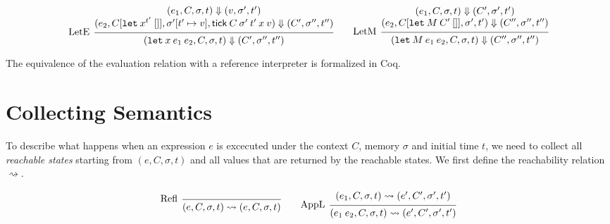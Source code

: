 \documentclass{article}
\theoremstyle{definition}
\newcommand*{\tick}{\mathsf{tick}}
\begin{document}
\[
  \begin{prooftree}
    \hypo{
      \begin{matrix}
        (e_{1}, C, \sigma, t)
        \Downarrow
        (v, \sigma', t') \\
        (e_{2}, C[\mathtt{let}\:x^{t'}\:[]], \sigma'[t'\mapsto v], \tick\:C\:\sigma'\:t'\:x\:v)
        \Downarrow
        (C', \sigma'', t'')
      \end{matrix}
    }
    \infer[left label=LetE]1{
    (\mathtt{let}\:x\:e_1\:e_2, C, \sigma, t)
    \Downarrow
    (C', \sigma'', t'')
    }
  \end{prooftree}\qquad
  \begin{prooftree}
    \hypo{
      \begin{matrix}
        (e_{1}, C, \sigma, t)
        \Downarrow
        (C', \sigma', t') \\
        (e_{2}, C[\mathtt{let}\:M\:C'\:[]], \sigma', t')
        \Downarrow
        (C'', \sigma'', t'')
      \end{matrix}
    }
    \infer[left label=LetM]1{
    (\mathtt{let}\:M\:e_{1}\:e_{2}, C, \sigma, t)
    \Downarrow
    (C'', \sigma'', t'')
    }
  \end{prooftree}
\]

The equivalence of the evaluation relation with a reference interpreter is formalized in Coq.

\section{Collecting Semantics}

To describe what happens when an expression $e$ is excecuted under the context $C$, memory $\sigma$ and initial time $t$, we need to collect all \emph{reachable states} starting from $(e,C,\sigma,t)$ and all values that are returned by the reachable states.
We first define the reachability relation $\rightsquigarrow$.

\[
  \begin{prooftree}
    \infer[left label={Refl}]0{
    (e, C, \sigma, t)
    \rightsquigarrow
    (e, C, \sigma, t)
    }
  \end{prooftree}\qquad
  \begin{prooftree}
    \hypo{
      \begin{matrix}
        (e_{1}, C, \sigma, t)
        \rightsquigarrow
        (e',C',\sigma',t')
      \end{matrix}
    }
    \infer[left label={AppL}]1{
    (e_{1}\:e_{2}, C, \sigma, t)
    \rightsquigarrow
    (e',C', \sigma',t')
    }
  \end{prooftree}
\]
\end{document}
